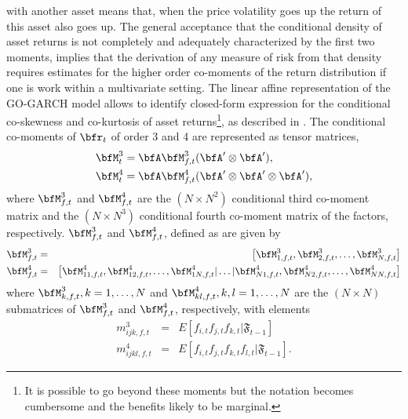 with another asset means that, when the price volatility goes up the return of
this asset also goes up. The general acceptance that the conditional density of
asset returns is not completely and adequately  characterized by the first two
moments, implies that the derivation of any measure of risk from that density
requires estimates for the higher order co-moments of the return distribution if
one is work within a multivariate setting. The linear affine representation of
the GO-GARCH model allows to identify closed-form expression for the conditional
co-skewness and co-kurtosis of asset returns\footnote{It is possible to go beyond
these moments but the notation becomes cumbersome and the benefits likely to
be marginal.}, as described in \cite{Athayde2000}. The conditional co-moments
of \( \bfr_t \) of order 3 and 4  are represented as tensor matrices,
\begin{equation}\label{eq:facd6}
\begin{gathered}
  \bfM_{t}^3 = \bfA \bfM_{f,t}^3(\bfA' \otimes \bfA'), \hfill \\
  \bfM_{t}^4 = \bfA \bfM_{f,t}^4(\bfA' \otimes \bfA' \otimes \bfA'), \hfill \\
\end{gathered}
\end{equation}
where \( \bfM_{f,t}^3\) and \( \bfM_{f,t}^4 \) are the \( (N \times N^2) \)
conditional third co-moment matrix and the \( (N \times N^3) \) conditional
fourth co-moment matrix of the factors, respectively. \( \bfM_{f,t}^3 \)
and \( \bfM_{f,t}^4\), defined as are given by
\begin{eqnarray}
\bfM_{f,t}^3 & =&
\begin{bmatrix}
\bfM_{1,f,t}^3,\bfM_{2,f,t}^3,\ldots,\bfM_{N,f,t}^3
\end{bmatrix} \label{eq:comoment_factor_matrix_3}\\
\bfM_{f,t}^4 & = &
\begin{bmatrix}
\bfM_{11,f,t}^4,\bfM_{12,f,t}^4,\ldots,\bfM_{1N,f,t}^4|\ldots|\bfM_{N1,f,t}^4,\bfM_{N2,f,t}^4,\ldots,\bfM_{NN,f,t}^4
\end{bmatrix}\label{eq:comoment_factor_matrix_4}
\end{eqnarray}
where \( \bfM_{k,f,t}^3, k=1,\ldots,N \) and \( \bfM_{kl,f,t}^4, k,l=1,\ldots,N \)
are the \((N\times N)\) submatrices of \( \bfM_{f,t}^3 \) and \( \bfM_{f,t}^4\),
respectively, with elements
\begin{eqnarray*}
m_{ijk,f,t}^3 & = & E[f_{i,t}f_{j,t}f_{k,t}|\mathfrak{F}_{t-1}] \\
m_{ijkl,f,t}^4 & = & E[f_{i,t}f_{j,t}f_{k,t}f_{l,t}|\mathfrak{F}_{t-1}].
\end{eqnarray*}
